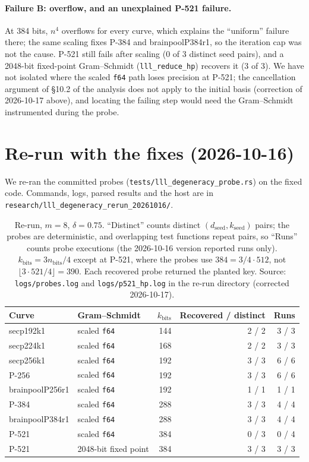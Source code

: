 \documentclass[10pt,a4paper]{article}
\begin{document}
\paragraph{Failure B: overflow, and an unexplained P-521 failure.} At
384 bits, $n^4$ overflows for every curve, which explains the
``uniform'' failure there; the same scaling fixes P-384 and
brainpoolP384r1, so the iteration cap was not the cause. P-521 still
fails after scaling (0 of 3 distinct seed pairs), and a 2048-bit
fixed-point Gram--Schmidt (\texttt{lll\_reduce\_hp}) recovers it
(3 of 3). We have not isolated where the scaled \texttt{f64} path
loses precision at P-521; the cancellation argument of \S10.2 of the
analysis does not apply to the initial basis (correction of
2026-10-17 above), and locating the failing step would need the
Gram--Schmidt instrumented during the probe.

\section{Re-run with the fixes (2026-10-16)}
\label{sec:rerun}

We re-ran the committed probes (\nolinkurl{tests/lll_degeneracy_probe.rs})
on the fixed code. Commands, logs, parsed results and the host are in
\nolinkurl{research/lll_degeneracy_rerun_20261016/}.

\begin{table}[h]
\centering
\begin{tabular}{llrrr}
\toprule
Curve & Gram--Schmidt & $k_{\text{bits}}$ & Recovered / distinct & Runs \\
\midrule
secp192k1        & scaled \texttt{f64}  & 144 & 2 / 2 & 3 / 3 \\
secp224k1        & scaled \texttt{f64}  & 168 & 2 / 2 & 3 / 3 \\
secp256k1        & scaled \texttt{f64}  & 192 & 3 / 3 & 6 / 6 \\
P-256            & scaled \texttt{f64}  & 192 & 3 / 3 & 6 / 6 \\
brainpoolP256r1  & scaled \texttt{f64}  & 192 & 1 / 1 & 1 / 1 \\
P-384            & scaled \texttt{f64}  & 288 & 3 / 3 & 4 / 4 \\
brainpoolP384r1  & scaled \texttt{f64}  & 288 & 3 / 3 & 4 / 4 \\
P-521            & scaled \texttt{f64}  & 384 & 0 / 3 & 0 / 4 \\
P-521            & 2048-bit fixed point & 384 & 3 / 3 & 3 / 3 \\
\bottomrule
\end{tabular}
\caption{Re-run, $m = 8$, $\delta = 0.75$. ``Distinct'' counts
distinct $(d_{\text{seed}}, k_{\text{seed}})$ pairs; the probes are
deterministic, and overlapping test functions repeat pairs, so
``Runs'' counts probe executions (the 2026-10-16 version reported
runs only). $k_{\text{bits}} = 3 n_{\text{bits}}/4$ except at P-521,
where the probes use $384 = 3/4 \cdot 512$, not
$\lfloor 3 \cdot 521/4 \rfloor = 390$. Each recovered probe returned
the planted key. Source: \texttt{logs/probes.log} and
\texttt{logs/p521\_hp.log} in the re-run directory (corrected
2026-10-17).}
\label{tab:rerun}
\end{table}
\end{document}
